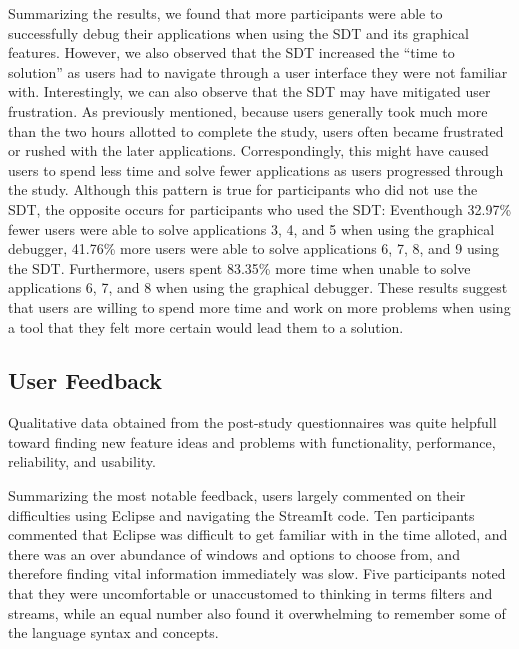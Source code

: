 \documentclass[11pt, letterpaper, onecolumn]{article}
\begin{document}
Summarizing the results, we found  that more participants were able to
successfully  debug their  applications  when using  the  SDT and  its
graphical features.  However, we also observed that  the SDT increased
the  ``time to  solution'' as  users had  to navigate  through  a user
interface  they were  not familiar  with. Interestingly,  we  can also
observe  that  the  SDT   may  have  mitigated  user  frustration.  As
previously mentioned, because users  generally took much more than the
two  hours  allotted  to   complete  the  study,  users  often  became
frustrated  or rushed  with the  later  applications. Correspondingly,
this  might have  caused  users to  spend  less time  and solve  fewer
applications  as users  progressed  through the  study. Although  this
pattern is true for participants who did not use the SDT, the opposite
occurs  for participants who  used the  SDT: Eventhough  32.97\% fewer
users  were able  to solve  applications 3,  4, and  5 when  using the
graphical debugger, 41.76\% more users were able to solve applications
6, 7,  8, and 9 using  the SDT. Furthermore, users  spent 83.35\% more
time when  unable to  solve applications  6, 7, and  8 when  using the
graphical debugger.  These results suggest  that users are  willing to
spend more time and work on more problems when using a tool that they
felt more certain would lead them to a solution.


\subsection{User Feedback}

Qualitative data  obtained from the post-study  questionnaires was
quite helpfull toward  finding  new   feature  ideas  and  problems  with
functionality, performance, reliability, and usability.

Summarizing  the most  notable  feedback, users  largely commented  on
their difficulties using Eclipse and navigating the StreamIt code. Ten
participants commented that Eclipse was difficult to get familiar with
in the  time alloted, and there  was an over abundance  of windows and
options  to  choose  from,  and therefore  finding  vital  information
immediately  was  slow.   Five   participants  noted  that  they  were
uncomfortable  or  unaccustomed  to  thinking  in  terms  filters  and
streams, while an equal number  also found it overwhelming to remember
some of the language syntax and concepts.
\end{document}
